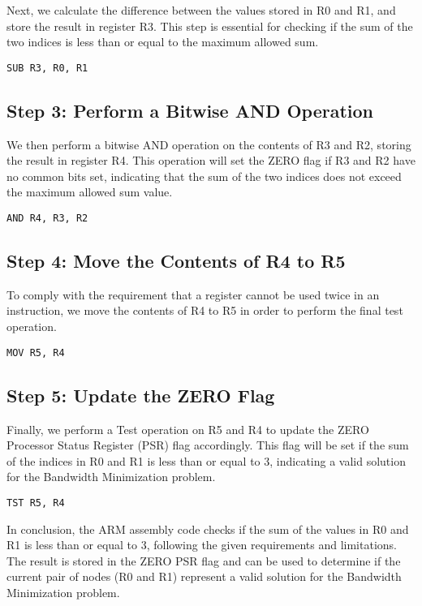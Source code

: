 Next, we calculate the difference between the values stored in R0 and R1, and store the result in register R3. This step is essential for checking if the sum of the two indices is less than or equal to the maximum allowed sum.

\begin{verbatim}
SUB R3, R0, R1
\end{verbatim}

\subsection{Step 3: Perform a Bitwise AND Operation}

We then perform a bitwise AND operation on the contents of R3 and R2, storing the result in register R4. This operation will set the ZERO flag if R3 and R2 have no common bits set, indicating that the sum of the two indices does not exceed the maximum allowed sum value.

\begin{verbatim}
AND R4, R3, R2
\end{verbatim}

\subsection{Step 4: Move the Contents of R4 to R5}

To comply with the requirement that a register cannot be used twice in an instruction, we move the contents of R4 to R5 in order to perform the final test operation.

\begin{verbatim}
MOV R5, R4
\end{verbatim}

\subsection{Step 5: Update the ZERO Flag}

Finally, we perform a Test operation on R5 and R4 to update the ZERO Processor Status Register (PSR) flag accordingly. This flag will be set if the sum of the indices in R0 and R1 is less than or equal to 3, indicating a valid solution for the Bandwidth Minimization problem.

\begin{verbatim}
TST R5, R4
\end{verbatim}

In conclusion, the ARM assembly code checks if the sum of the values in R0 and R1 is less than or equal to 3, following the given requirements and limitations. The result is stored in the ZERO PSR flag and can be used to determine if the current pair of nodes (R0 and R1) represent a valid solution for the Bandwidth Minimization problem.

